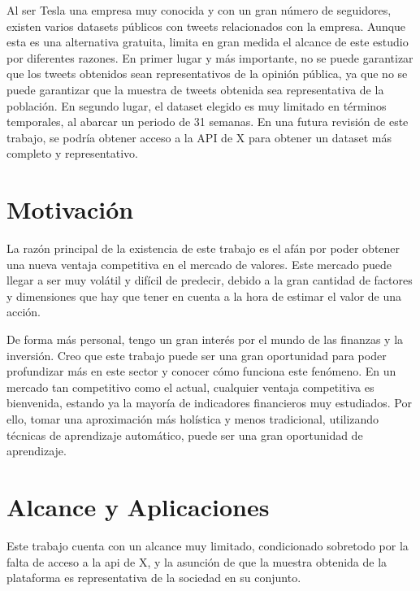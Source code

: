 \documentclass[a4paper, 12pt]{report}
\begin{document}
                Al ser Tesla una empresa muy conocida y con un gran número de seguidores, existen varios datasets públicos con tweets relacionados con la empresa. Aunque esta es una alternativa gratuita,
                limita en gran medida el alcance de este estudio por diferentes razones. En primer lugar y más importante, no se puede garantizar que los tweets obtenidos sean representativos de la opinión pública,
                ya que no se puede garantizar que la muestra de tweets obtenida sea representativa de la población. En segundo lugar, el dataset elegido es muy limitado en términos temporales, al abarcar
                un periodo de 31 semanas. En una futura revisión de este trabajo, se podría obtener acceso a la API de X para obtener un dataset más completo y representativo.\\

        \section{Motivación}

                La razón principal de la existencia de este trabajo es el afán por poder obtener una nueva ventaja competitiva en el mercado de valores.
                Este mercado puede llegar a ser muy volátil y difícil de predecir, debido a la gran cantidad de factores y dimensiones que hay que tener en cuenta a la hora de estimar
                el valor de una acción.

                De forma más personal, tengo un gran interés por el mundo de las finanzas y la inversión. Creo que este trabajo puede ser una gran oportunidad
                para poder profundizar más en este sector y conocer cómo funciona este fenómeno. En un mercado tan competitivo como el actual, cualquier ventaja competitiva es bienvenida,
                estando ya la mayoría de indicadores financieros muy estudiados. Por ello, tomar una aproximación más holística y menos tradicional, utilizando 
                técnicas de aprendizaje automático, puede ser una gran oportunidad de aprendizaje.\\

        \section{Alcance y Aplicaciones}

                        
                Este trabajo cuenta con un alcance muy limitado, condicionado sobretodo por la falta de acceso a la api de X, y la asunción de que la muestra obtenida de la plataforma es representativa de la sociedad en su conjunto.
\end{document}
